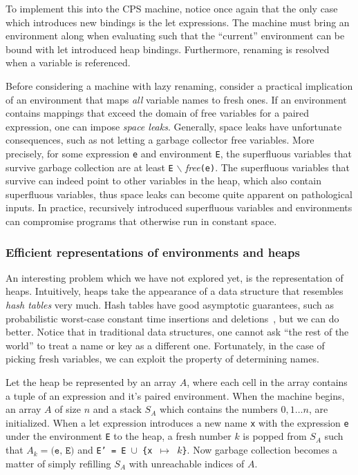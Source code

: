 To implement this into the CPS machine, notice once again that the only case which introduces new bindings is the let expressions.
The machine must bring an environment along when evaluating such that the ``current'' environment can be bound with let introduced heap bindings.
Furthermore, renaming is resolved when a variable is referenced.

Before considering a machine with lazy renaming, consider a practical implication of an environment that maps \textit{all} variable names to fresh ones.
If an environment contains mappings that exceed the domain of free variables for a paired expression, one can impose \textit{space leaks}.
Generally, space leaks have unfortunate consequences, such as not letting a garbage collector free variables.
More precisely, for some expression \texttt{e} and environment \texttt{E}, the superfluous variables that survive garbage collection are at least \texttt{E} $\backslash$ \textit{free}\texttt{(e)}.
The superfluous variables that survive can indeed point to other variables in the heap, which also contain superfluous variables, thus space leaks can become quite apparent on pathological inputs.
In practice, recursively introduced superfluous variables and environments can compromise programs that otherwise run in constant space.

\subsubsection{Efficient representations of environments and heaps}
An interesting problem which we have not explored yet, is the representation of heaps.
Intuitively, heaps take the appearance of a data structure that resembles \textit{hash tables} very much.
Hash tables have good asymptotic guarantees, such as probabilistic worst-case constant time insertions and deletions~\cite{cormen2009introduction}, but we can do better.
Notice that in traditional data structures, one cannot ask ``the rest of the world'' to treat a name or key as a different one.
Fortunately, in the case of picking fresh variables, we can exploit the property of determining names.

Let the heap be represented by an array $A$, where each cell in the array contains a tuple of an expression and it's paired environment.
When the machine begins, an array $A$ of size $n$ and a stack $S_A$ which contains the numbers $0,1 \dots n$, are initialized.
When a let expression introduces a new name \texttt{x} with the expression \texttt{e} under the environment \texttt{E} to the heap, a fresh number $k$ is popped from $S_A$ such that $A_k = \texttt{(e, E)}$ and \texttt{E' = E $\cup$ \{x $\mapsto$ $k$\}}.
Now garbage collection becomes a matter of simply refilling $S_A$ with unreachable indices of $A$.

